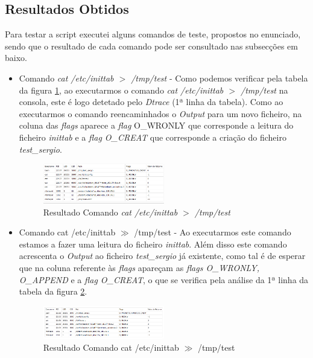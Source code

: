 \documentclass[conference,compsoc]{IEEEtran}
\begin{document}
\subsection{Resultados Obtidos}
Para testar a script executei alguns comandos de teste, propostos no enunciado, sendo que o resultado de cada comando pode ser consultado nas subsecções em baixo.

\begin{itemize}
\item Comando \textit{cat /etc/inittab $>$ /tmp/test} - Como podemos verificar pela tabela da figura \ref{fig:cat1}, ao executarmos o comando \textit{cat /etc/inittab $>$ /tmp/test} na consola, este é logo detetado pelo \textit{Dtrace} (1ª linha da tabela). Como ao executarmos o comando reencaminhados o \textit{Output} para um novo ficheiro, na coluna das \textit{flags} aparece a \textit{flag} O\_WRONLY que corresponde a leitura do ficheiro \textit{inittab} e a \textit{flag O\_CREAT} que corresponde a criação do ficheiro \textit{test\_sergio}. 

\begin{figure}[h!]
\begin{center}
\includegraphics[width=0.5\textwidth]{Tables/cat1.png}
\caption{Resultado Comando \textit{cat /etc/inittab $>$ /tmp/test}}
\label{fig:cat1}
\end{center}
\end{figure}

\item Comando cat /etc/inittab $\gg$ /tmp/test - Ao executarmos este comando estamos a fazer uma leitura do ficheiro \textit{inittab}. Além disso este comando acrescenta o \textit{Output} ao ficheiro \textit{test\_sergio} já existente, como tal é de esperar que na coluna referente às \textit{flags} apareçam as \textit{flags O\_WRONLY, O\_APPEND} e a \textit{flag O\_CREAT}, o que se verifica pela análise da 1ª linha da tabela da figura \ref{fig:cat2}.
\begin{figure}[h!]
\begin{center}
\includegraphics[width=0.5\textwidth]{Tables/cat2.png}
\caption{Resultado Comando cat /etc/inittab $\gg$ /tmp/test}
\label{fig:cat2}
\end{center}
\end{figure}


\end{itemize}
\end{document}
